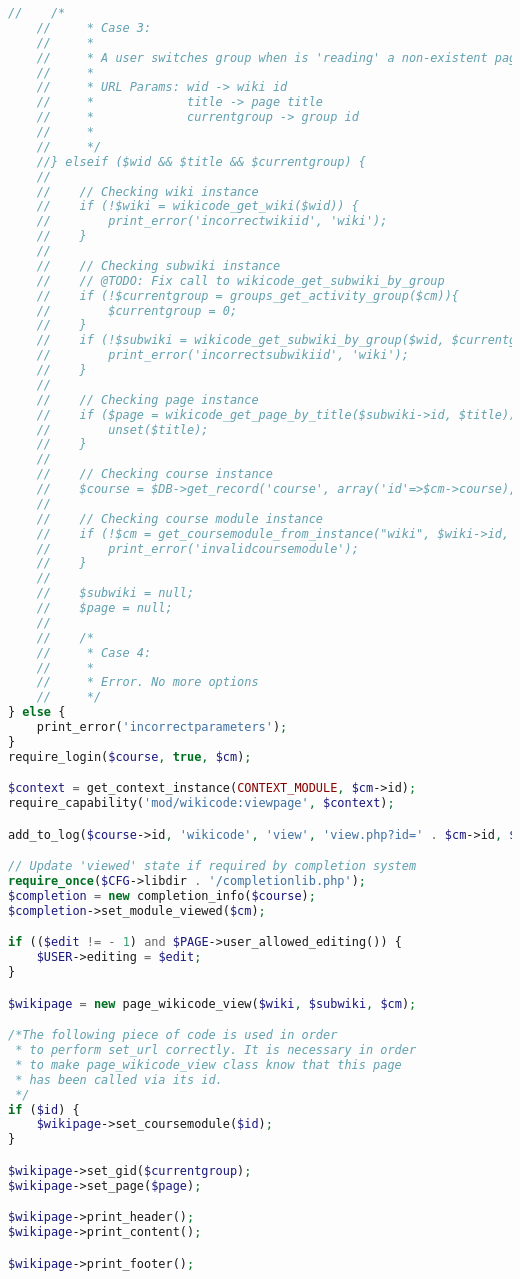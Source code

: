 \begin{lstlisting}[language=PHP]
    //    /*
    //     * Case 3:
    //     *
    //     * A user switches group when is 'reading' a non-existent page.
    //     *
    //     * URL Params: wid -> wiki id
    //     *             title -> page title
    //     *             currentgroup -> group id
    //     *
    //     */
    //} elseif ($wid && $title && $currentgroup) {
    //
    //    // Checking wiki instance
    //    if (!$wiki = wikicode_get_wiki($wid)) {
    //        print_error('incorrectwikiid', 'wiki');
    //    }
    //
    //    // Checking subwiki instance
    //    // @TODO: Fix call to wikicode_get_subwiki_by_group
    //    if (!$currentgroup = groups_get_activity_group($cm)){
    //        $currentgroup = 0;
    //    }
    //    if (!$subwiki = wikicode_get_subwiki_by_group($wid, $currentgroup)) {
    //        print_error('incorrectsubwikiid', 'wiki');
    //    }
    //
    //    // Checking page instance
    //    if ($page = wikicode_get_page_by_title($subwiki->id, $title)) {
    //        unset($title);
    //    }
    //
    //    // Checking course instance
    //    $course = $DB->get_record('course', array('id'=>$cm->course), '*', MUST_EXIST);
    //
    //    // Checking course module instance
    //    if (!$cm = get_coursemodule_from_instance("wiki", $wiki->id, $course->id)) {
    //        print_error('invalidcoursemodule');
    //    }
    //
    //    $subwiki = null;
    //    $page = null;
    //
    //    /*
    //     * Case 4:
    //     *
    //     * Error. No more options
    //     */
} else {
    print_error('incorrectparameters');
}
require_login($course, true, $cm);

$context = get_context_instance(CONTEXT_MODULE, $cm->id);
require_capability('mod/wikicode:viewpage', $context);

add_to_log($course->id, 'wikicode', 'view', 'view.php?id=' . $cm->id, $wiki->id);

// Update 'viewed' state if required by completion system
require_once($CFG->libdir . '/completionlib.php');
$completion = new completion_info($course);
$completion->set_module_viewed($cm);

if (($edit != - 1) and $PAGE->user_allowed_editing()) {
    $USER->editing = $edit;
}

$wikipage = new page_wikicode_view($wiki, $subwiki, $cm);

/*The following piece of code is used in order
 * to perform set_url correctly. It is necessary in order
 * to make page_wikicode_view class know that this page
 * has been called via its id.
 */
if ($id) {
    $wikipage->set_coursemodule($id);
}

$wikipage->set_gid($currentgroup);
$wikipage->set_page($page);

$wikipage->print_header();
$wikipage->print_content();

$wikipage->print_footer();
\end{lstlisting}

